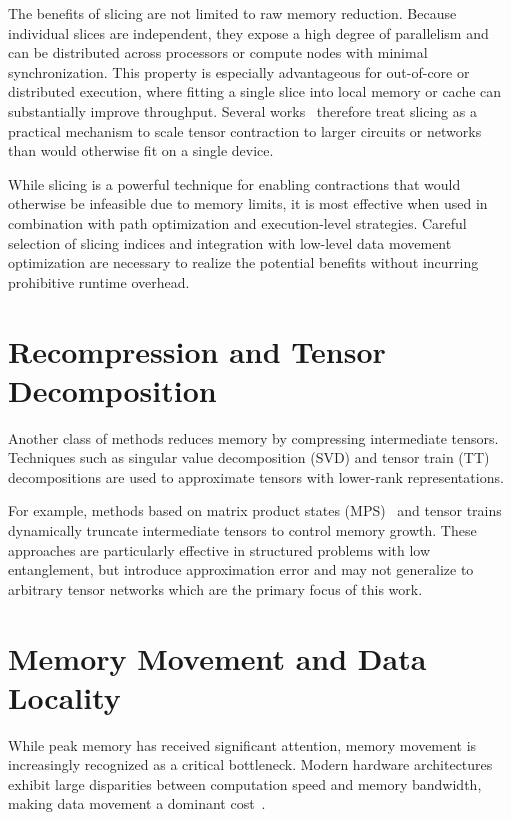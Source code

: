 The benefits of slicing are not limited to raw memory reduction. Because individual slices are independent, they expose a high degree of parallelism and can be distributed across processors or compute nodes with minimal synchronization. This property is especially advantageous for out-of-core or distributed execution, where fitting a single slice into local memory or cache can substantially improve throughput. Several works~\cite{gray2021hyper,huang2021efficient,liu2021sunway,schutski2020simple} therefore treat slicing as a practical mechanism to scale tensor contraction to larger circuits or networks than would otherwise fit on a single device.

While slicing is a powerful technique for enabling contractions that would otherwise be infeasible due to memory limits, it is most effective when used in combination with path optimization and execution-level strategies. Careful selection of slicing indices and integration with low-level data movement optimization are necessary to realize the potential benefits without incurring prohibitive runtime overhead.

\section{Recompression and Tensor Decomposition}

Another class of methods reduces memory by compressing intermediate tensors. Techniques such as singular value decomposition (SVD) and tensor train (TT) decompositions are used to approximate tensors with lower-rank representations.

For example, methods based on matrix product states (MPS)~\cite{schollwock2011density} and tensor trains~\cite{oseledets2011tensor} dynamically truncate intermediate tensors to control memory growth. These approaches are particularly effective in structured problems with low entanglement, but introduce approximation error and may not generalize to arbitrary tensor networks which are the primary focus of this work.

\section{Memory Movement and Data Locality}

While peak memory has received significant attention, memory movement is increasingly recognized as a critical bottleneck. Modern hardware architectures exhibit large disparities between computation speed and memory bandwidth, making data movement a dominant cost~\cite{ballard2011minimizing}.

